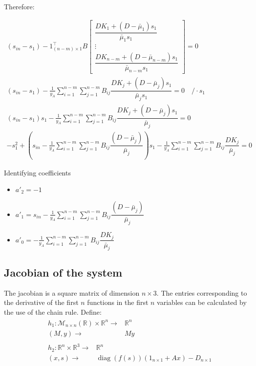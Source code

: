 \documentclass[3p,times]{article}
\newcommand{\R}{\mathbb{R}}
\DeclareMathOperator{\diag}{diag}
\begin{document}
Therefore:

\begin{align}
(s_{in}-s_1)- 1_{(n-m)\times 1}^\top 
B\begin{bmatrix}
\dfrac{DK_1+(D-\bar{\mu}_1)s_1}{\bar{\mu}_{1}s_1} \\ \vdots \\ \dfrac{DK_{n-m}+(D-\bar{\mu}_{n-m})s_1}{\bar{\mu}_{n-m}s_1}
\end{bmatrix} = 0 \\
(s_{in}-s_1) -\frac{1}{y_A} \sum \limits_{i=1}^{n-m}\sum \limits_{j=1}^{n-m} B_{ij}\dfrac{DK_j+(D-\bar{\mu}_j)s_1}{\bar{\mu}_{j}s_1}  = 0 \quad /\cdot s_1 \\
(s_{in} - s_1)s_1   -\frac{1}{y_A} \sum \limits_{i=1}^{n-m}\sum \limits_{j=1}^{n-m} B_{ij}\dfrac{DK_j+(D-\bar{\mu}_j)s_1}{\bar{\mu}_{j}}  = 0 \\
-s_1^2 + \left( s_{in}-\frac{1}{y_A} \sum \limits_{i=1}^{n-m}\sum \limits_{j=1}^{n-m} B_{ij}\dfrac{(D-\bar{\mu}_j)}{\bar{\mu}_{j}} \right)s_1 - \frac{1}{y_A} \sum \limits_{i=1}^{n-m}\sum \limits_{j=1}^{n-m} B_{ij}\dfrac{DK_j}{\bar{\mu}_{j}} =0
\end{align} 

Identifying coefficients
\begin{itemize}
	\item $a'_2 = -1$
	\item $a'_1 = s_{in}-\frac{1}{y_A} \sum \limits_{i=1}^{n-m}\sum \limits_{j = 1}^{n-m} B_{ij}\dfrac{(D-\bar{\mu}_j)}{\bar{\mu}_{j}}$
	\item $a'_0 =- \frac{1}{y_A} \sum \limits_{i=1}^{n-m}\sum \limits_{j = 1}^{n-m} B_{ij}\dfrac{DK_j}{\bar{\mu}_{j}}$ 
\end{itemize}


\subsection{Jacobian of the system}
The jacobian is a square matrix of dimension $n\times 3$. The entries corresponding to the derivative of the first $n$ functions in the first $n$ variables can be calculated by the use of the chain rule. Define:
\begin{align*} 
& \begin{array}{rc}
h_1:\mathcal{M}_{n \times n}(\R) \times \R^n \rightarrow & \R^n \\
(M,y) \rightarrow & My
\end{array}  \\
&\begin{array}{rl}
h_2: \R^n \times \R^3  \rightarrow & \R^n \\
(x,s) \rightarrow & \diag(f(s))\left(1_{n\times 1}+ Ax\right)-D_{n\times 1}
\end{array} 	
\end{align*}
\end{document}
